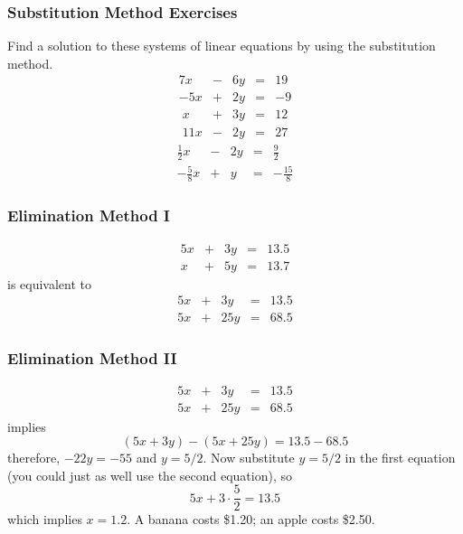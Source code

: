 \documentclass[xcolor=dvipsnames]{beamer}
\begin{document}
\begin{frame}
  \frametitle{Substitution Method Exercises}
Find a solution to these systems of linear equations by using the
substitution method.
  \begin{equation}
    \label{eq:waduifee}
    \begin{array}{rcrcl}
      7x&-&6y&=&19 \\
      -5x&+&2y&=&-9
    \end{array}
  \end{equation}
  \begin{equation}
    \label{eq:weiyushe}
    \begin{array}{rcrcl}
      x&+&3y&=&12 \\
      11x&-&2y&=&27
    \end{array}
  \end{equation}
  \begin{equation}
    \label{eq:jiadaush}
    \begin{array}{rcrcl}
      \frac{1}{2}x&-&2y&=&\frac{9}{2} \\
      -\frac{5}{8}x&+&y&=&-\frac{15}{8}
    \end{array}
  \end{equation}
\end{frame}

\begin{frame}
  \frametitle{Elimination Method I}
  \begin{equation}
    \label{eq:ohneirae}
    \begin{array}{rcrcl}
      5x&+&3y&=&13.5 \\
      x&+&5y&=&13.7
    \end{array}
  \end{equation}
is equivalent to
  \begin{equation}
    \label{eq:wahheedo}
    \begin{array}{rcrcl}
      5x&+&3y&=&13.5 \\
      5x&+&25y&=&68.5
    \end{array}
  \end{equation}
\end{frame}

\begin{frame}
  \frametitle{Elimination Method II}
  \begin{equation}
    \label{eq:zeegheir}
    \begin{array}{rcrcl}
      5x&+&3y&=&13.5 \\
      5x&+&25y&=&68.5
    \end{array}
  \end{equation}
implies
  \begin{equation}
    \label{eq:ooleeyae}
(5x+3y)-(5x+25y)=13.5-68.5
  \end{equation}
therefore, $-22y=-55$ and $y=5/2$. Now substitute $y=5/2$ in the first
equation (you could just as well use the second equation), so
\begin{equation}
  \label{eq:ieghoisa}
  5x+3\cdot\frac{5}{2}=13.5
\end{equation}
which implies $x=1.2$. A banana costs \$1.20; an apple costs \$2.50.
\end{frame}
\end{document}
